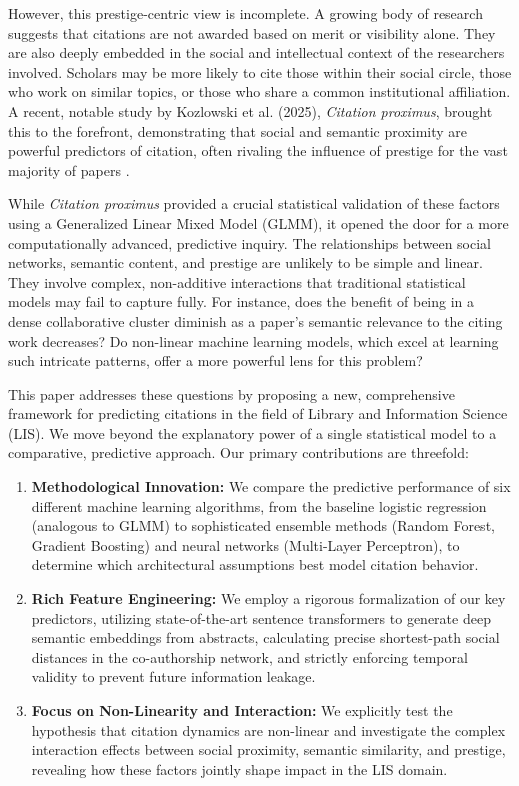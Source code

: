 \documentclass[11pt,a4paper]{article}
\begin{document}
However, this prestige-centric view is incomplete. A growing body of research suggests that citations are not awarded based on merit or visibility alone. They are also deeply embedded in the social and intellectual context of the researchers involved. Scholars may be more likely to cite those within their social circle, those who work on similar topics, or those who share a common institutional affiliation. A recent, notable study by Kozlowski et al. (2025), \textit{Citation proximus}, brought this to the forefront, demonstrating that social and semantic proximity are powerful predictors of citation, often rivaling the influence of prestige for the vast majority of papers \cite{kozlowski2025}.

While \textit{Citation proximus} provided a crucial statistical validation of these factors using a Generalized Linear Mixed Model (GLMM), it opened the door for a more computationally advanced, predictive inquiry. The relationships between social networks, semantic content, and prestige are unlikely to be simple and linear. They involve complex, non-additive interactions that traditional statistical models may fail to capture fully. For instance, does the benefit of being in a dense collaborative cluster diminish as a paper's semantic relevance to the citing work decreases? Do non-linear machine learning models, which excel at learning such intricate patterns, offer a more powerful lens for this problem?

This paper addresses these questions by proposing a new, comprehensive framework for predicting citations in the field of Library and Information Science (LIS). We move beyond the explanatory power of a single statistical model to a comparative, predictive approach. Our primary contributions are threefold:

\begin{enumerate}
    \item \textbf{Methodological Innovation:} We compare the predictive performance of six different machine learning algorithms, from the baseline logistic regression (analogous to GLMM) to sophisticated ensemble methods (Random Forest, Gradient Boosting) and neural networks (Multi-Layer Perceptron), to determine which architectural assumptions best model citation behavior.
    \item \textbf{Rich Feature Engineering:} We employ a rigorous formalization of our key predictors, utilizing state-of-the-art sentence transformers to generate deep semantic embeddings from abstracts, calculating precise shortest-path social distances in the co-authorship network, and strictly enforcing temporal validity to prevent future information leakage.
    \item \textbf{Focus on Non-Linearity and Interaction:} We explicitly test the hypothesis that citation dynamics are non-linear and investigate the complex interaction effects between social proximity, semantic similarity, and prestige, revealing how these factors jointly shape impact in the LIS domain.
\end{enumerate}
\end{document}
